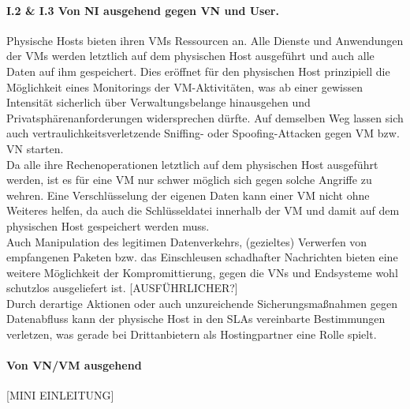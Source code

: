\paragraph{I.2 \& I.3 Von NI ausgehend gegen VN und User.}
\label{parag:vonNI}
Physische Hosts bieten ihren VMs Ressourcen an. Alle Dienste und Anwendungen der VMs werden letztlich auf dem physischen Host ausgeführt und auch alle Daten auf ihm gespeichert. Dies eröffnet für den physischen Host prinzipiell die Möglichkeit eines Monitorings der VM-Aktivitäten, was ab einer gewissen Intensität sicherlich über Verwaltungsbelange hinausgehen und Privatsphärenanforderungen widersprechen dürfte. Auf demselben Weg lassen sich auch vertraulichkeitsverletzende Sniffing- oder Spoofing-Attacken gegen VM bzw. VN starten. \\
Da alle ihre Rechenoperationen letztlich auf dem physischen Host ausgeführt werden, ist es für eine VM nur schwer möglich sich gegen solche Angriffe zu wehren. Eine Verschlüsselung der eigenen Daten kann einer VM nicht ohne Weiteres helfen, da auch die Schlüsseldatei innerhalb der VM und damit auf dem physischen Host gespeichert werden muss.\\
Auch Manipulation des legitimen Datenverkehrs, (gezieltes) Verwerfen von empfangenen Paketen bzw. das Einschleusen schadhafter Nachrichten bieten eine weitere Möglichkeit der Kompromittierung, gegen die VNs und Endsysteme wohl schutzlos ausgeliefert ist.
[AUSFÜHRLICHER?]\\
Durch derartige Aktionen oder auch unzureichende Sicherungsmaßnahmen gegen Datenabfluss kann der physische Host in den SLAs vereinbarte Bestimmungen verletzen, was gerade bei Drittanbietern als Hostingpartner eine Rolle spielt.



\paragraph{Von VN/VM ausgehend}
\label{parag:vonVN}
[MINI EINLEITUNG]

